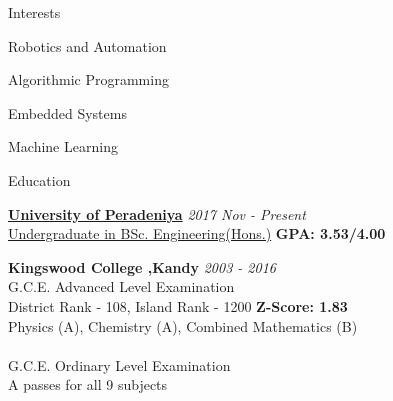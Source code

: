 \documentclass{resume} %
\begin{document}

\begin{rSection}{Interests}
\begin{rSubsection}{}{}{}{}
\item Robotics and Automation
\item Algorithmic Programming 
\item Embedded Systems
\item Machine Learning
\end{rSubsection}


\end{rSection}


\begin{rSection}{Education}

{\bf \href{http://eng.pdn.ac.lk}{University of Peradeniya}} \hfill {\em 2017 Nov - Present} 
\\ \href{http://eng.pdn.ac.lk/deee/academic/undergraduate.php}{Undergraduate in BSc. Engineering(Hons.)} \hfill {\bf  GPA: 3.53/4.00}

{\bf{Kingswood College ,Kandy}} \hfill {\em 2003 - 2016} 
\\ G.C.E. Advanced Level Examination
\\ District Rank - 108, Island Rank - 1200 \hfill {\bf  Z-Score: 1.83}
\\ Physics (A), Chemistry (A), Combined Mathematics (B)
\\
\\ G.C.E. Ordinary Level Examination
\\ A passes for all 9 subjects

\end{rSection}



\end{document}
